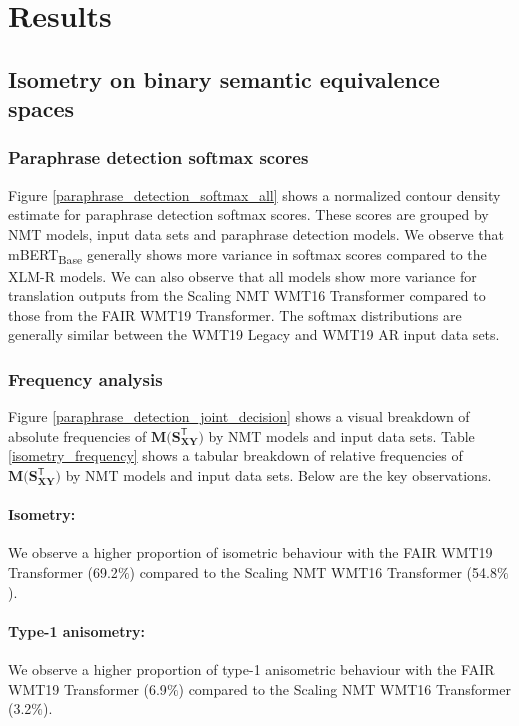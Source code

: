 \documentclass[11pt,a4paper]{article}
\begin{document}
\section{Results}

\subsection{Isometry on binary semantic equivalence spaces}

\subsubsection{Paraphrase detection softmax scores}

Figure \ref{paraphrase_detection_softmax_all} shows a normalized contour density estimate for paraphrase detection softmax scores. These scores are grouped by NMT models, input data sets and paraphrase detection models. We observe that mBERT\textsubscript{Base} generally shows more variance in softmax scores compared to the XLM-R models. We can also observe that all models show more variance for translation outputs from the Scaling NMT WMT16 Transformer compared to those from the FAIR WMT19 Transformer. The softmax distributions are generally similar between the WMT19 Legacy and WMT19 AR input data sets.

\subsubsection{Frequency analysis}

Figure \ref{paraphrase_detection_joint_decision} shows a visual breakdown of absolute frequencies of $\mathbf{M(S_{XY}^{\mathsf{T}}})$ by NMT models and input data sets. Table \ref{isometry_frequency} shows a tabular breakdown of relative frequencies of $\mathbf{M(S_{XY}^{\mathsf{T}}})$ by NMT models and input data sets. Below are the key observations.

\paragraph{Isometry:} We observe a higher proportion of isometric behaviour with the FAIR WMT19 Transformer (69.2$\%$) compared to the Scaling NMT WMT16 Transformer (54.8$\%$).
\paragraph{Type-1 anisometry:} We observe a higher proportion of type-1 anisometric behaviour with the FAIR WMT19 Transformer (6.9$\%$) compared to the Scaling NMT WMT16 Transformer (3.2$\%$).
\end{document}
